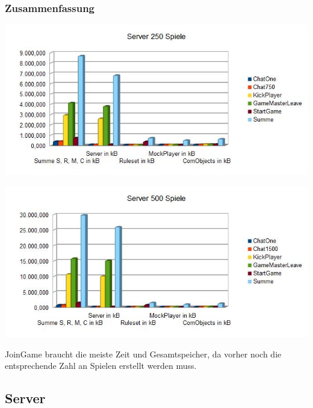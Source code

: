 \documentclass[a4paper]{article}
\begin{document}
\subsubsection{Zusammenfassung}

\begin{center}
\includegraphics[scale=0.75]{7}
\end{center}

\begin{center}
\includegraphics[scale=0.75]{8}
\end{center}

JoinGame braucht die meiste Zeit und Gesamtspeicher, da vorher noch die entsprechende Zahl an Spielen erstellt werden muss.


\subsection{Server}
\end{document}
